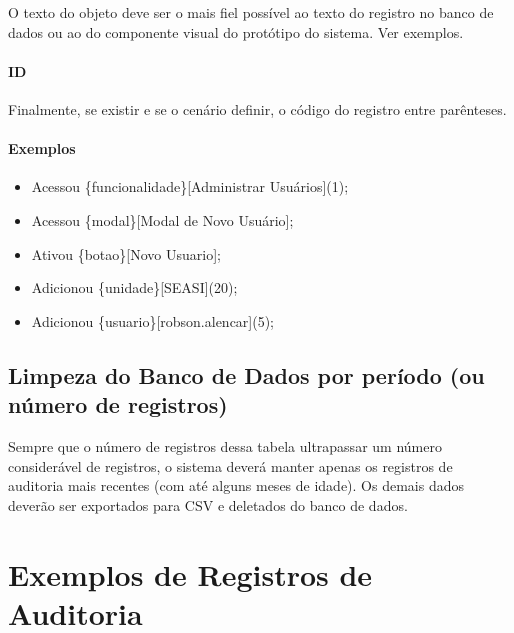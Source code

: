 	O texto do objeto deve ser o mais fiel possível ao texto do registro no banco de dados ou ao do componente visual do protótipo do sistema. Ver exemplos.
	
\subsubsection{ID}
	 Finalmente, se existir e se o cenário definir, o código do registro entre parênteses. 

\subsubsection{Exemplos}

	\begin{itemize}
		\item Acessou \{funcionalidade\}[Administrar Usuários](1);	
		\item Acessou \{modal\}[Modal de Novo Usuário];	
		\item Ativou \{botao\}[Novo Usuario];	
		\item Adicionou \{unidade\}[SEASI](20);	
		\item Adicionou \{usuario\}[robson.alencar](5);	
	\end{itemize}



\section{Limpeza do Banco de Dados por período (ou número de registros)}

Sempre que o número de registros dessa tabela ultrapassar um número considerável de registros, o sistema deverá manter apenas os registros de auditoria mais recentes  (com até alguns meses de idade). Os demais dados deverão ser exportados para CSV e deletados do banco de dados.


\chapter{Exemplos de Registros de Auditoria}

